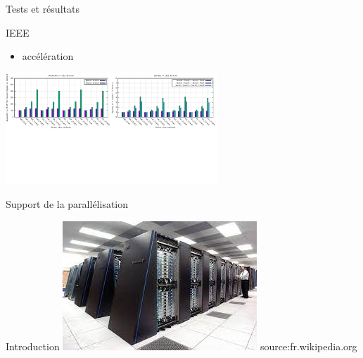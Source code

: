 \documentclass{beamer}
\begin{document}
\begin{frame}{Tests et résultats}
    \begin{block}{IEEE}
    \begin{itemize}
        \item accélération
    \end{itemize}
 \centering\includegraphics[width=300px]{../ressources/vm_ieee.png}
    \end{block}
    
\end{frame}
\begin{frame}{Support de la parallélisation}

  \begin{block}{Introduction}
    \includegraphics[width=0.6\linewidth]{../ressources/index.jpeg}
    source:fr.wikipedia.org
  \end{block}

\end{frame}
\end{document}
